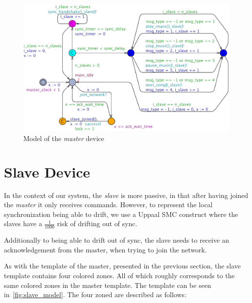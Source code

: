 \begin{figure}[htb]
    \centering
    \includegraphics[width=1\textwidth]{master_model.pdf}
    \caption{Model of the \textit{master} device}\label{fig:master_model}
\end{figure}

\section*{Slave Device}

In the context of our system, the \textit{slave} is more passive, in that after having joined the \textit{master} it only receives commands.
However, to represent the local synchronization being able to drift, we use a Uppaal SMC construct where the slaves have a $\frac{1}{1000}$ risk of drifting out of sync.

Additionally to being able to drift out of sync, the slave needs to receive an acknowledgement from the master, when trying to join the network.

\bigskip
As with the template of the master, presented in the previous section, the slave template contains four colored zones.
All of which roughly corresponds to the same colored zones in the master template.
The template can be seen in~\cref{fig:slave_model}.
The four zoned are described as follows:

